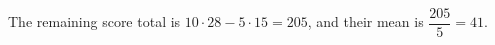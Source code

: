 The remaining score total is $10\cdot28-5\cdot15=205$, and their mean is $\dfrac{205}{5}=\boxed{41}$.
